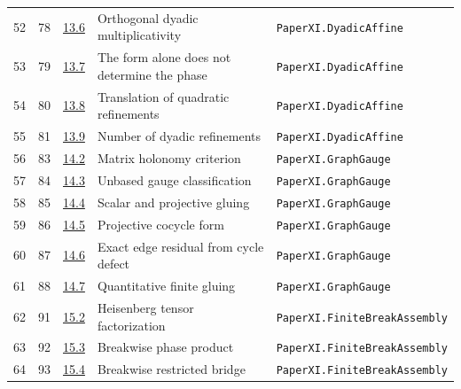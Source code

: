 \documentclass[10pt,oneside]{book}
\begin{document}
\begin{longtable}{@{}p{}p{}p{}>{\raggedright\arraybackslash}p{}p{}@{}}
52&78&\href{https://komorebi.invalid/b07/obligation_52}{13.6}&Orthogonal dyadic multiplicativity&\nolinkurl{PaperXI.DyadicAffine}\\

53&79&\href{https://komorebi.invalid/b07/obligation_53}{13.7}&The form alone does not determine the phase&\nolinkurl{PaperXI.DyadicAffine}\\

54&80&\href{https://komorebi.invalid/b07/obligation_54}{13.8}&Translation of quadratic refinements&\nolinkurl{PaperXI.DyadicAffine}\\

55&81&\href{https://komorebi.invalid/b07/obligation_55}{13.9}&Number of dyadic refinements&\nolinkurl{PaperXI.DyadicAffine}\\

56&83&\href{https://komorebi.invalid/b07/obligation_56}{14.2}&Matrix holonomy criterion&\nolinkurl{PaperXI.GraphGauge}\\

57&84&\href{https://komorebi.invalid/b07/obligation_57}{14.3}&Unbased gauge classification&\nolinkurl{PaperXI.GraphGauge}\\

58&85&\href{https://komorebi.invalid/b07/obligation_58}{14.4}&Scalar and projective gluing&\nolinkurl{PaperXI.GraphGauge}\\

59&86&\href{https://komorebi.invalid/b07/obligation_59}{14.5}&Projective cocycle form&\nolinkurl{PaperXI.GraphGauge}\\

60&87&\href{https://komorebi.invalid/b07/obligation_60}{14.6}&Exact edge residual from cycle defect&\nolinkurl{PaperXI.GraphGauge}\\

61&88&\href{https://komorebi.invalid/b07/obligation_61}{14.7}&Quantitative finite gluing&\nolinkurl{PaperXI.GraphGauge}\\

62&91&\href{https://komorebi.invalid/b07/obligation_62}{15.2}&Heisenberg tensor factorization&\nolinkurl{PaperXI.FiniteBreakAssembly}\\

63&92&\href{https://komorebi.invalid/b07/obligation_63}{15.3}&Breakwise phase product&\nolinkurl{PaperXI.FiniteBreakAssembly}\\

64&93&\href{https://komorebi.invalid/b07/obligation_64}{15.4}&Breakwise restricted bridge&\nolinkurl{PaperXI.FiniteBreakAssembly}\\


\end{longtable}
\end{document}
